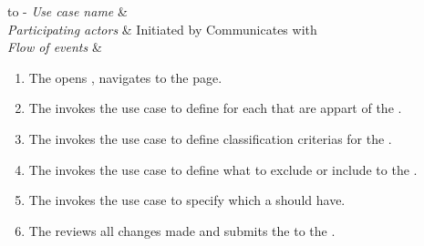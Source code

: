 %
%
\begin{table}[h!]
\tabulinesep =1.5mm
\begin{tabu} to 
	\tabucline[1.5pt]-
	\textit{Use case name} & \manageStudy \\
	\hline
	\textit{Participating actors} & Initiated by \researcher \newline Communicates with \client \\
	\hline
	\textit{Flow of events} &
	\vspace{-3mm}

\begin{enumerate}[leftmargin=*,topsep=0pt,itemsep=-1ex]
	\item The \researcher opens \client, navigates to the \studyConfigUI page.\\
	\item The \researcher invokes the \manageRole use case to define \role for each \user that are appart of the \studycon.\\
	\item The \researcher invokes the \manageClassCrit use case to define classification criterias for the \studycon.\\
	\item The \researcher invokes the \manageInExCrit use case to define  what to exclude or include to the \studycon.\\
	\item The \researcher invokes the \manageTask use case to specify which \task a \user should have.\\
	\item The \researcher reviews all changes made and submits the \studycon to the \studyConfigServer.\\	
			
\end{enumerate}
\end{tabu}
\end{table}
